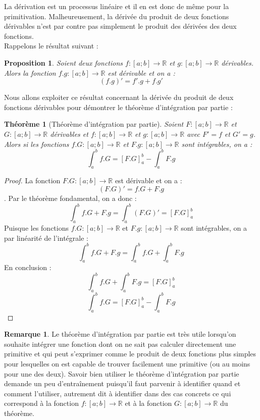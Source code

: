 \documentclass[a4paper,fontsize=13pt]{scrreprt}
\theoremstyle{plain}
\newtheorem{thé}[subsection]{Théorème}
\newtheorem{pro}[subsection]{Proposition}
\theoremstyle{definition}
\newtheorem{rema}[subsection]{Remarque}
\newcommand{\rr}{\mathbb{R}}
\begin{document}
La dérivation est un processus linéaire et il en est donc de même pour la primitivation. Malheureusement, la dérivée du produit de deux fonctions dérivables n'est par contre pas simplement le produit des dérivées des deux fonctions. \\ Rappelons le résultat suivant :
\begin{pro}
Soient deux fonctions $f : [a;b] \to \rr$ et $g : [a;b] \to \rr$ dérivables. \\
Alors la fonction $f.g : [a;b] \to \rr$ est dérivable et on a :
$$(f.g)' = f'.g + f.g'$$
\end{pro}
Nous allons exploiter ce résultat concernant la dérivée du produit de deux fonctions dérivables pour démontrer le théorème d'intégration par partie :
\begin{thé} [Théorème d'intégration par partie]
Soient $F : [a;b] \to \rr$ et $G : [a;b] \to \rr$ dérivables et $f : [a;b] \to \rr$ et $g : [a;b] \to \rr$ avec $F'=f$ et $G'=g$. \\
Alors si les fonctions $f.G : [a;b] \to \rr$ et $F.g : [a;b] \to \rr$ sont intégrables, on a :
$$\int_a^b f.G = [F.G]_a^b - \int_a^b F.g$$
\end{thé}
\begin{proof}
La fonction $F.G : [a;b] \to \rr$ est dérivable et on a : $$(F.G)' = f.G + F.g$$. Par le théorème fondamental, on a donc :
$$\int_a^b f.G + F.g =  \int_a^b (F.G)' = [F.G]_a^b$$
Puisque les fonctions $f.G : [a;b] \to \rr$ et $F.g : [a;b] \to \rr$ sont intégrables, on a par linéarité de l'intégrale :
$$\int_a^b f.G + F.g = \int_a^b f.G + \int_a^b F.g$$
En conclusion :
$$\int_a^b f.G + \int_a^b F.g = [F.G]_a^b$$
$$\int_a^b f.G = [F.G]_a^b - \int_a^b F.g$$
\end{proof}
\begin{rema}
Le théorème d'intégration par partie est très utile lorsqu'on souhaite intégrer une fonction dont on ne sait pas calculer directement une primitive et qui peut s'exprimer comme le produit de deux fonctions plus simples pour lesquelles on est capable de trouver facilement une primitive (ou au moins pour une des deux). Savoir bien utiliser le théorème d'intégration par partie demande un peu d'entraînement puisqu'il faut parvenir à identifier quand et comment l'utiliser, autrement dit à identifier dans des cas concrets ce qui correspond à la fonction $f : [a;b] \to \rr$ et à la fonction $G : [a;b] \to \rr$ du théorème.
\end{rema}
\end{document}
